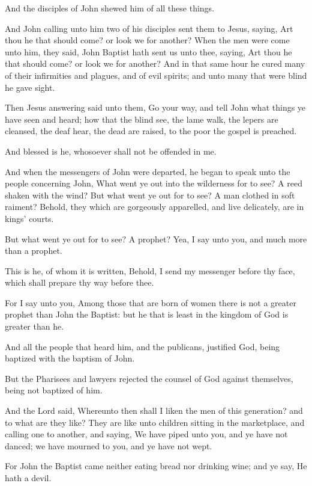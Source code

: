 \verse And the disciples of John shewed him of all these things.

\verse And John calling unto him two of his disciples sent them to Jesus, saying, Art thou he that should come? or look we for another?  \verse When the men were come unto him, they said, John Baptist hath sent us unto thee, saying, Art thou he that should come? or look we for another?  \verse And in that same hour he cured many of their infirmities and plagues, and of evil spirits; and unto many that were blind he gave sight.

\verse Then Jesus answering said unto them, Go your way, and tell John what things ye have seen and heard; how that the blind see, the lame walk, the lepers are cleansed, the deaf hear, the dead are raised, to the poor the gospel is preached.

\verse And blessed is he, whosoever shall not be offended in me.

\verse And when the messengers of John were departed, he began to speak unto the people concerning John, What went ye out into the wilderness for to see?  A reed shaken with the wind?  \verse But what went ye out for to see? A man clothed in soft raiment?  Behold, they which are gorgeously apparelled, and live delicately, are in kings' courts.

\verse But what went ye out for to see? A prophet? Yea, I say unto you, and much more than a prophet.

\verse This is he, of whom it is written, Behold, I send my messenger before thy face, which shall prepare thy way before thee.

\verse For I say unto you, Among those that are born of women there is not a greater prophet than John the Baptist: but he that is least in the kingdom of God is greater than he.

\verse And all the people that heard him, and the publicans, justified God, being baptized with the baptism of John.

\verse But the Pharisees and lawyers rejected the counsel of God against themselves, being not baptized of him.

\verse And the Lord said, Whereunto then shall I liken the men of this generation? and to what are they like?  \verse They are like unto children sitting in the marketplace, and calling one to another, and saying, We have piped unto you, and ye have not danced; we have mourned to you, and ye have not wept.

\verse For John the Baptist came neither eating bread nor drinking wine; and ye say, He hath a devil.

